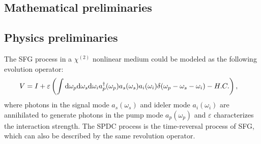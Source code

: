 \documentclass[../../note.tex]{subfiles}
\begin{document}
\subsection{Mathematical preliminaries}
\begin{proposition}
    
\end{proposition}

\subsection{Physics preliminaries}
\begin{definition}
The SFG process in a $\chi^{(2)}$ nonlinear medium could be modeled as the following evolution operator:
\begin{align}
    \label{evolution operator of sfg process}
    V
    &= I + \varepsilon\left(\int {\rm d}\omega_p {\rm d}\omega_s{\rm d}\omega_i a_p^\dagger(\omega_p)a_s(\omega_s)a_i(\omega_i)\delta(\omega_p - \omega_s - \omega_i) - H.C. \right),
\end{align}
where photons in the signal mode $a_s(\omega_s)$ and ideler mode $a_i(\omega_i)$ are annihilated to generate photons in the pump mode $a_p(\omega_p)$ and $\varepsilon$ characterizes the interaction strength. The SPDC process is the time-reversal process of SFG, which can also be described by the same revolution operator.
\end{definition}

\begin{definition}[SPDC]
    
\end{definition}

\begin{definition}
    
\end{definition}

\begin{theorem}
    
\end{theorem}

\begin{definition}
    
\end{definition}

\begin{definition}
    
\end{definition}
\end{document}
